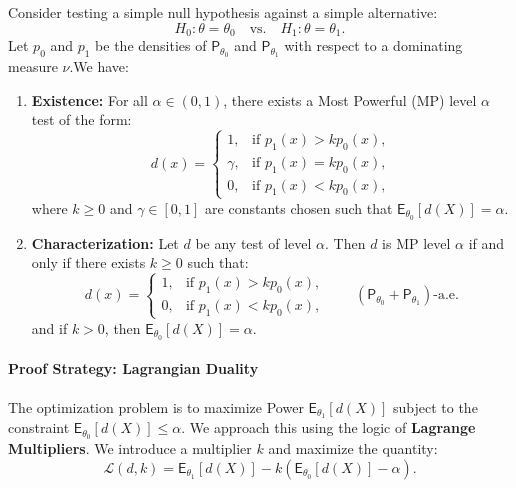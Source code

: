 \begin{theo}
\label{thm:neyman_pearson}

Consider testing a simple null hypothesis against a simple alternative:
\[ H_0: \theta = \theta_0 \quad \text{vs.} \quad H_1: \theta = \theta_1. \]
Let $p_0$ and $p_1$ be the densities of $\mathsf{P}_{\theta_0}$ and $\mathsf{P}_{\theta_1}$ with respect to a dominating measure $\nu$.We have:

\begin{enumerate}[label=\alph*)]
    \item \textbf{Existence:} For all $\alpha \in (0,1)$, there exists a Most Powerful (MP) level $\alpha$ test of the form:
    \[
    d(x) = \begin{cases} 
    1, & \text{if } p_1(x) > k p_0(x), \\ 
    \gamma, & \text{if } p_1(x) = k p_0(x), \\ 
    0, & \text{if } p_1(x) < k p_0(x), 
    \end{cases}
    \]
    where $k \ge 0$ and $\gamma \in [0, 1]$ are constants chosen such that $\mathsf{E}_{\theta_0}[d(X)] = \alpha$.

    \item \textbf{Characterization:} Let $d$ be any test of level $\alpha$. Then $d$ is MP level $\alpha$ if and only if there exists $k \geq 0$ such that:
    \[
    d(x) = \begin{cases} 
    1, & \text{if } p_1(x) > k p_0(x), \\ 
    0, & \text{if } p_1(x) < k p_0(x), 
    \end{cases} \qquad (\mathsf{P}_{\theta_0} + \mathsf{P}_{\theta_1})\text{-a.e.}
    \]
    and if $k > 0$, then $\mathsf{E}_{\theta_0}[d(X)] = \alpha$.
\end{enumerate}
\end{theo}

\paragraph{Proof Strategy: Lagrangian Duality}
The optimization problem is to maximize Power $\mathsf{E}_{\theta_1}[d(X)]$ subject to the constraint $\mathsf{E}_{\theta_0}[d(X)] \le \alpha$. We approach this using the logic of \textbf{Lagrange Multipliers}. We introduce a multiplier $k$ and maximize the quantity:
\[ \mathcal{L}(d, k) = \mathsf{E}_{\theta_1}[d(X)] - k(\mathsf{E}_{\theta_0}[d(X)] - \alpha). \]


